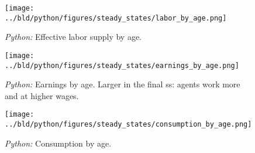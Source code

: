 \documentclass[11pt, a4paper, leqno]{article}
\begin{document}
\begin{figure}
    
    \centering
    \texttt{[image: ../bld/python/figures/steady\_states/labor\_by\_age.png]}
    \caption{\emph{Python:} Effective labor supply by age.}
    \label{fig:python-L}

\end{figure}

\begin{figure}

    \centering
    \texttt{[image: ../bld/python/figures/steady\_states/earnings\_by\_age.png]}
    \caption{\emph{Python:} Earnings by age. Larger in the final ss: agents work more and at higher wages.}
    \label{fig:python-E}

\end{figure}


\begin{figure}

    \centering
    \texttt{[image: ../bld/python/figures/steady\_states/consumption\_by\_age.png]}
    \caption{\emph{Python:} Consumption by age.}
    \label{fig:python-C}

\end{figure}

\printbibliography
\end{document}
